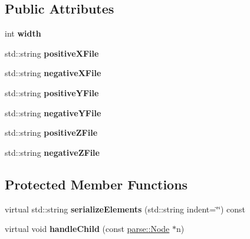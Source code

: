 \subsection*{Public Attributes}
\begin{DoxyCompactItemize}
\item 
\hypertarget{classg2c_1_1_cube_map_a25677e3926095e106b83e4406688bc9c}{
int {\bfseries width}}
\label{classg2c_1_1_cube_map_a25677e3926095e106b83e4406688bc9c}

\item 
\hypertarget{classg2c_1_1_cube_map_aa207f97d38424b66825bb447a71b0cec}{
std::string {\bfseries positiveXFile}}
\label{classg2c_1_1_cube_map_aa207f97d38424b66825bb447a71b0cec}

\item 
\hypertarget{classg2c_1_1_cube_map_a410eebe9ff923407e7793ec7357484e5}{
std::string {\bfseries negativeXFile}}
\label{classg2c_1_1_cube_map_a410eebe9ff923407e7793ec7357484e5}

\item 
\hypertarget{classg2c_1_1_cube_map_a3d134e8eb82816053111731676c57c45}{
std::string {\bfseries positiveYFile}}
\label{classg2c_1_1_cube_map_a3d134e8eb82816053111731676c57c45}

\item 
\hypertarget{classg2c_1_1_cube_map_ab6548ef34db04e1d1997592428ce7d6d}{
std::string {\bfseries negativeYFile}}
\label{classg2c_1_1_cube_map_ab6548ef34db04e1d1997592428ce7d6d}

\item 
\hypertarget{classg2c_1_1_cube_map_a5c2ce3f42e96695f6a75afe40563e1f2}{
std::string {\bfseries positiveZFile}}
\label{classg2c_1_1_cube_map_a5c2ce3f42e96695f6a75afe40563e1f2}

\item 
\hypertarget{classg2c_1_1_cube_map_a8651988d4b3c3a6bbb35dd428dabd57c}{
std::string {\bfseries negativeZFile}}
\label{classg2c_1_1_cube_map_a8651988d4b3c3a6bbb35dd428dabd57c}

\end{DoxyCompactItemize}
\subsection*{Protected Member Functions}
\begin{DoxyCompactItemize}
\item 
\hypertarget{classg2c_1_1_cube_map_a45fe1d91eaeb89ef171bb1cc06c69ca3}{
virtual std::string {\bfseries serializeElements} (std::string indent=\char`\"{}\char`\"{}) const }
\label{classg2c_1_1_cube_map_a45fe1d91eaeb89ef171bb1cc06c69ca3}

\item 
\hypertarget{classg2c_1_1_cube_map_a6ee20db7e6fc1de8ae52e7083b459b2b}{
virtual void {\bfseries handleChild} (const \hyperlink{classparse_1_1_node}{parse::Node} $\ast$n)}
\label{classg2c_1_1_cube_map_a6ee20db7e6fc1de8ae52e7083b459b2b}

\end{DoxyCompactItemize}
